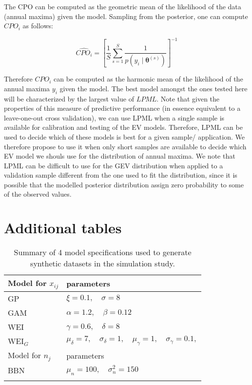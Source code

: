 \documentclass[]{article}
\begin{document}
The CPO can be computed as the geometric mean of the likelihood of the
data (annual maxima) given the model. Sampling from the posterior, one
can compute\(CPO_i\) as follows:

\begin{equation}
    \widehat{CPO_i} = \left[ \frac{1}{S} \sum_{s = 1}^{S} \frac{1}{p\left( y_i \mid
    \mathbf{\theta}^{\left(s\right)}\right)}\right]^{-1}
\end{equation}

Therefore \(CPO_i\) can be computed as the harmonic mean of the
likelihood of the annual maxima \(y_i\) given the model. The best model
amongst the ones tested here will be characterized by the largest value
of \(LPML\). Note that given the properties of this measure of
predictive performance (in essence equivalent to a leave-one-out cross
validation), we can use LPML when a single sample is available for
calibration and testing of the EV models. Therefore, LPML can be used to
decide which of these models is best for a given sample/ application. We
therefore propose to use it when only short samples are available to
decide which EV model we shouls use for the distribution of annual
maxima. We note that LPML can be difficult to use for the GEV
distribution when applied to a validation sample different from the one
used to fit the distribution, since it is possible that the modelled
posterior distribution assign zero probability to some of the observed
values.

\section{Additional tables}

\begin{table}[h]
    \centering
    \caption{Summary of 4 model specifications used to generate synthetic datasets in the simulation study.}
    \begin{tabular}{ll}

        \hline
        Model for $x_{ij}$  & parameters \\ \hline

        GP  & $\xi = 0.1, \quad \sigma = 8$ \\
        GAM  & $\alpha = 1.2, \quad \beta = 0.12$ \\
        WEI  & $\gamma = 0.6, \quad \delta = 8 $ \\
        WEI$_G$  & $\mu_{\delta} = 7, \quad \sigma_{\delta} = 1, \quad \mu_{\gamma} = 1, \quad \sigma_{\gamma} = 0.1,$ \\
        \hline
        Model for $n_{j}$  & parameters \\ \hline
        BBN & $ \mu_n = 100, \quad \sigma^2_n = 150 $  \\ \hline

        \label{tab:simulations}
    \end{tabular}
\end{table}
\end{document}

